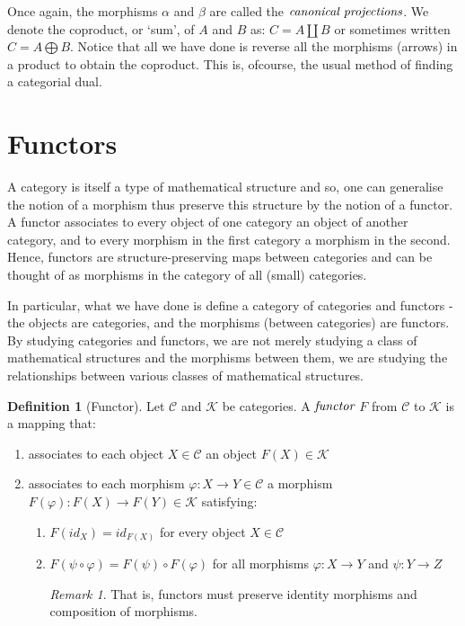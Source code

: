 \documentclass[10pt, oneside, reqno]{amsart}
\theoremstyle{plain}%
\theoremstyle{definition}
\newtheorem{defn}[thm]{Definition}
\theoremstyle{remark}
\newtheorem*{rem}{Remark}
\begin{document}
Once again, the morphisms $\alpha$ and $\beta$ are called the $\emph{canonical projections}$.
We denote the coproduct, or `sum', of $A$ and $B$ as: $C = A \coprod B$ or sometimes written $C = A \bigoplus B$.
Notice that all we have done is reverse all the morphisms (arrows) in a product to obtain the coproduct.
This is, ofcourse, the usual method of finding a categorial dual.


\section{Functors} %
\label{sec:functors}
A category is itself a type of mathematical structure and so, one can generalise the notion of a morphism thus preserve this structure by the notion of a
functor.
A functor associates to every object of one category an object of another category, and to every morphism in the first category a morphism in the second.
Hence, functors are structure-preserving maps between categories and can be thought of as morphisms in the category of all (small) categories.

In particular, what we have done is define a category of categories and functors - the objects are categories, and the morphisms (between categories) 
are functors.
By studying categories and functors, we are not merely studying a class of mathematical structures and the morphisms between them,
we are studying the relationships between various classes of mathematical structures.

\begin{defn}[Functor]
	Let $\mathcal{C}$ and $\mathcal{K}$ be categories. A $\emph{functor}$ $F$ from $\mathcal{C}$ to $\mathcal{K}$ is a mapping that:
	\begin{enumerate}
		\item associates to each object $X \in \mathcal{C}$ an object $F(X) \in  \mathcal{K}$
		
		\item associates to each morphism $\varphi: X \to Y \in \mathcal{C}$ a morphism $F(\varphi) : F(X) \to F(Y) \in \mathcal{K}$
		satisfying:
		\begin{enumerate}
			\item $F(id_{X}) = id_{F(X)}$ for every object $X \in \mathcal{C}$
			
			\item $F(\psi \circ \varphi) = F(\psi) \circ F(\varphi)$ for all morphisms $\varphi: X \to Y$ and $\psi: Y \to Z$
			\begin{rem}
				That is, functors must preserve identity morphisms and composition of morphisms.
			\end{rem}
		\end{enumerate}
	\end{enumerate}
\end{defn}
\end{document}
